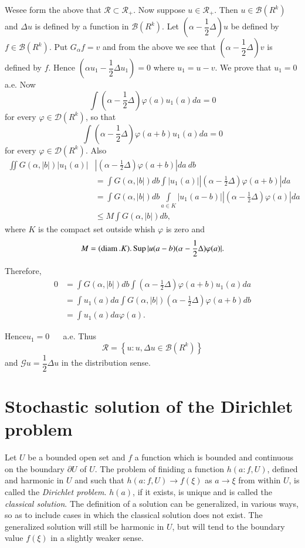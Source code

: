 We\pageoriginale see form the above that $\mathscr{R} \subset
\mathscr{R}_+$. Now suppose $u \in \mathscr{R}_+$. Then $u \in
\mathscr{B}(R^k)$ and 
$\Delta u$ is defined by a function in $\mathscr{B}(R^k)$. Let
$(\alpha - \dfrac{1}{2}\Delta)u$ be defined by $f \in
\mathscr{B}(R^k)$. Put $G_\alpha f = v$ and from the above we see that
$(\alpha - \dfrac{1}{2}\Delta)v$ is defined by $f$. Hence $(\alpha u_1
- \dfrac{1}{2} \Delta u_1) = 0$ where $u_1 = u - v$. We prove that
$u_1 = 0$ a.e. Now 
$$
\int \left(\alpha - \dfrac{1}{2}\Delta\right) \varphi(a) u_1 (a) da = 0
$$
for every $\varphi \in \mathscr{D}(R^k)$, so that
$$
\int\left(\alpha - \dfrac{1}{2}\Delta\right) \varphi(a + b) u_1 (a) da = 0
$$
for every $\varphi \in  \mathscr{D}(R^k)$. Also
\begin{align*}
  \iint  G(\alpha, |b| ) | u_1 (a) |&| \left(\alpha - \frac{1}{2}\Delta\right)
  \varphi (a+b) | da~db \\ 
  & = \int G(\alpha, |b|)db \int |u_1(a)||\left(\alpha -
  \frac{1}{2}\Delta\right)  \varphi (a+b) | da \\ 
  & = \int G(\alpha, |b|)db \int \limits_{a \in K}|u_1(a-b)||\left(\alpha -
  \frac{1}{2}\Delta\right) \varphi (a)|da \\ 
  & \leq M \int G(\alpha, |b|)db,
\end{align*}
where $K$ is the compact set outside whish $\varphi$ is zero and 
$$
M = (\operatorname{diam}. K). \operatorname{Sup} |u(a-b)(\alpha-\frac{1}{2}\Delta)\varphi (a)|.
$$

Therefore, 
\begin{align*}
  0 & = \int G(\alpha, |b|) db \int \left(\alpha - \frac{1}{2}\Delta\right)
  \varphi (a+b)u_1 (a) da \\ 
  & = \int u_1(a) da \int G(\alpha, |b|) \left(\alpha-\frac{1}{2} \Delta\right)
  \varphi (a+b)db \\ 
  & = \int u_1(a) da \varphi(a).
\end{align*}\pageoriginale

Hence\quad $u_1 = 0$ ~~ a.e. \quad Thus
$$
\mathscr{R}= \left\{u : u, \Delta u \in \mathscr{B}(R^k) \right \}
$$
and $\mathscr{G} u = \dfrac{1}{2}\Delta u$ in the distribution sense.

\section{Stochastic solution of the Dirichlet
  problem}\label{chap3-sec3}%

Let $U$ be a bounded open set and $f$ a function which is bounded and
continuous on the boundary $\partial U$ of $U$. The problem of
finiding a function $h(a : f,U)$, defined and harmonic in $U$ and such
that $h(a: f, U)\to f(\xi)$ as $a \to \xi$ from within $U$, is called
the \textit{Dirichlet problem}. $h(a)$, if it exists, is unique and is
called the \textit{classical solution}. The definition of a solution
can be generalized, in various ways, so as to include cases in which
the classical solution does not exist. The generalized solution will
still be harmonic in $U$, but will tend to the boundary value $f(\xi)$
in a slightly weaker sense. 

